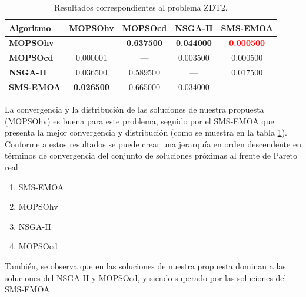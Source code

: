 \begin{table}
\begin{center}
\begin{tabular}{|l|cc|cc|}
	\textbf{Algoritmo} & \textbf{MOPSOhv} & \textbf{MOPSOcd} & \textbf{NSGA-II} & \textbf{SMS-EMOA} \\  \hline \hline
	\textbf{MOPSOhv} &---       &\textbf{0.637500} & \textbf{0.044000}  & \textbf{\textcolor{red}{0.000500}} \\ 
	\textbf{MOPSOcd} & 0.000001 & ---      & 0.003500  & 0.000500 \\ 
	\textbf{NSGA-II} & 0.036500 & 0.589500 & ---      & 0.017500  \\  
	\textbf{SMS-EMOA}& \textbf{0.026500} & 0.665000 & 0.034000 & --- \\  
	\hline
	\end{tabular}
  \caption{Resultados correspondientes al problema ZDT2.}
  \label{tab:zdt2}
\end{center}
\end{table}

La convergencia y la distribuci\'on de las soluciones de nuestra propuesta (MOPSOhv) es buena para este problema, seguido por el SMS-EMOA 
que presenta la mejor convergencia y distribuci\'on (como se muestra en la tabla \ref{tab:zdt2}). Conforme a estos resultados se puede crear una
jerarqu\'ia en orden descendente en t\'erminos de convergencia del conjunto de soluciones pr\'oximas al frente de Pareto real:

\begin{enumerate}
  \item SMS-EMOA
  \item MOPSOhv
  \item NSGA-II
  \item MOPSOcd
\end{enumerate}

Tambi\'en, se observa que en las soluciones de nuestra propuesta dominan a las soluciones del NSGA-II y MOPSOcd, y siendo superado por las 
soluciones del SMS-EMOA.

